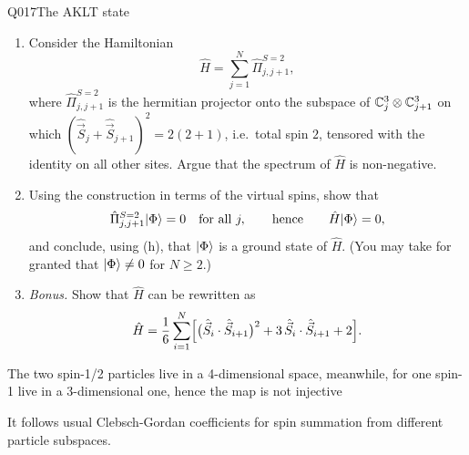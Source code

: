 \begin{entry}{Q017}{The AKLT state}
\begin{problem}
\begin{enumerate}[label=\textbf{(\alph*)},leftmargin=*]
  \item Consider the Hamiltonian
        \[
          \hat H=\sum_{j=1}^{N}\hat\Pi^{S=2}_{j,j+1},
        \]
        where $\hat\Pi^{S=2}_{j,j+1}$ is the hermitian projector onto the subspace of
        $\mathbb{C}^{3}_j\otimes\mathbb{C}^{3}_{j+1}$ on which
        $(\hat{\vec S}_j+\hat{\vec S}_{j+1})^{2}=2(2+1)$, i.e.\ total spin $2$, tensored
        with the identity on all other sites. Argue that the spectrum of $\hat H$ is
        non-negative.

  \item Using the construction in terms of the virtual spins, show that
        \[
          \hat\Pi^{S=2}_{j,j+1}\lvert \Phi \rangle=0\quad\text{for all } j,
          \qquad\text{hence}\qquad
          \hat H\lvert \Phi \rangle=0 ,
        \]
        and conclude, using (h), that $\lvert \Phi \rangle$ is a ground state of $\hat H$. (You may take for
        granted that $\lvert \Phi \rangle\neq 0$ for $N\ge 2$.)

  \item \emph{Bonus.} Show that $\hat H$ can be rewritten as
        \[
          \hat H=\frac16\sum_{i=1}^{N}\Bigl[\bigl(\hat{\vec S}_i\cdot\hat{\vec S}_{i+1}
            \bigr)^{2}+3\,\hat{\vec S}_i\cdot\hat{\vec S}_{i+1}+2\Bigr].
        \]
\end{enumerate}
\end{problem}


\begin{solution}[Part (a)]
The two spin-1/2 particles live in a 4-dimensional space, meanwhile, for one spin-1 live in a 3-dimensional one, hence the map is not injective
\end{solution}

\begin{solution}[Part (b)]
It follows usual Clebsch-Gordan coefficients for spin summation from different particle subspaces.
\end{solution}


\end{entry}
